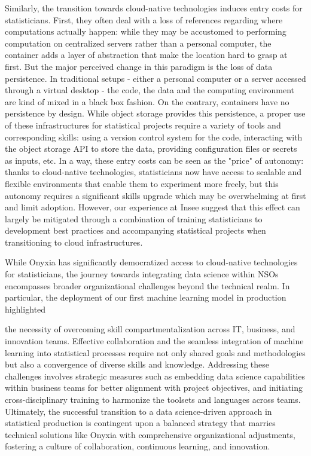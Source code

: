Similarly, the transition towards cloud-native technologies induces entry costs for statisticians. First, they often deal with a loss of references regarding where computations actually happen: while they may be accustomed to performing computation on centralized servers rather than a personal computer, the container adds a layer of abstraction that make the location hard to grasp at first. But the major perceived change in this paradigm is the loss of data persistence. In traditional setups - either a personal computer or a server accessed through a virtual desktop - the code, the data and the computing environment are kind of mixed in a black box fashion. On the contrary, containers have no persistence by design. While object storage provides this persistence, a proper use of these infrastructures for statistical projects require a variety of tools and corresponding skills: using a version control system for the code, interacting with the object storage API to store the data, providing configuration files or secrets as inputs, etc. In a way, these entry costs can be seen as the "price" of autonomy: thanks to cloud-native technologies, statisticians now have access to scalable and flexible environments that enable them to experiment more freely, but this autonomy requires a significant skills upgrade which may be overwhelming at first and limit adoption. However, our experience at Insee suggest that this effect can largely be mitigated through a combination of training statisticians to development best practices and accompanying statistical projects when transitioning to cloud infrastructures.

While Onyxia has significantly democratized access to cloud-native technologies for statisticians, the journey towards integrating data science within NSOs encompasses broader organizational challenges beyond the technical realm. In particular, the deployment of our first machine learning model in production highlighted 

the necessity of overcoming skill compartmentalization across IT, business, and innovation teams. Effective collaboration and the seamless integration of machine learning into statistical processes require not only shared goals and methodologies but also a convergence of diverse skills and knowledge. Addressing these challenges involves strategic measures such as embedding data science capabilities within business teams for better alignment with project objectives, and initiating cross-disciplinary training to harmonize the toolsets and languages across teams. Ultimately, the successful transition to a data science-driven approach in statistical production is contingent upon a balanced strategy that marries technical solutions like Onyxia with comprehensive organizational adjustments, fostering a culture of collaboration, continuous learning, and innovation.


